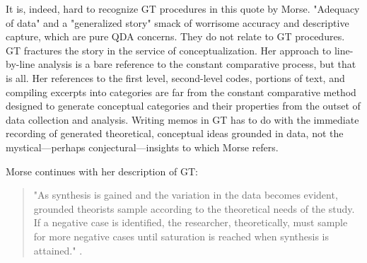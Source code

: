 It is, indeed, hard to recognize GT procedures in this quote by Morse.
"Adequacy of data" and a "generalized story" smack of worrisome accuracy and descriptive capture, 
which are pure QDA concerns. 
They do not relate to GT procedures. 
GT fractures the story in the service of conceptualization. 
Her approach to line-by-line analysis is a bare reference to the constant comparative process, but that is all. 
Her references to the first level, second-level codes, portions of text, and compiling excerpts into categories are far from the constant comparative method designed to generate conceptual categories and their properties from the outset of data collection and analysis.
Writing memos in GT has to do with the immediate recording of generated theoretical, conceptual ideas grounded in data, not the mystical—perhaps conjectural—insights to which Morse refers.

Morse continues with her description of GT:

\begin{quote}
"As synthesis is gained and the variation in the data becomes evident,
grounded theorists sample according to the theoretical needs of the
study. 
If a negative case is identified, the researcher, theoretically, must
sample for more negative cases until saturation is reached when
synthesis is attained."
\citep[p. 39]{incollection.morse94}.
\end{quote}











\vspace{100pt}

